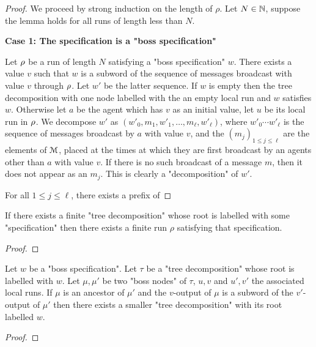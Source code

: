 \begin{proof}
	We proceed by strong induction on the length of $\rho$.
	Let $N \in \mathbb{N}$, suppose the lemma holds for all runs of length less than $N$.
	
	\textbf{Case 1: The specification is a "boss specification"}
	
	Let $\rho$ be a run of length $N$ satisfying a "boss specification" $w$.
	There exists a value $v$ such that $w$ is a subword of the sequence of messages broadcast with value $v$ through $\rho$. Let $w'$ be the latter sequence.
	If $w$ is empty then the tree decomposition with one node labelled with the an empty local run and $w$ satisfies $w$.	
	Otherwise let $a$ be the agent which has $v$ as an initial value, let $u$ be its local run in $\rho$. 
	We decompose $w'$ as $(w'_0, m_1, w'_1, \ldots, m_\ell, w'_\ell)$, where $w'_0\cdots w'_\ell$ is the sequence of messages broadcast by $a$ with value $v$, and the $(m_j)_{1\leq j\leq \ell}$ are the elements of $\mathcal{M}$, placed at the times at which they are first broadcast by an agents other than $a$ with value $v$. If there is no such broadcast of a message $m$, then it does not appear as an $m_j$. This is clearly a "decomposition" of $w'$.
	
	For all $1 \leq j \leq \ell$, there exists a prefix of 
\end{proof}

\begin{lemma}
	If there exists a finite "tree decomposition" whose root is labelled with some "specification" then there exists  a finite run $\rho$ satisfying that specification.
\end{lemma}

\begin{proof}
\end{proof}

\begin{lemma}
	Let $w$ be a "boss specification".
	Let $\tau$ be a "tree decomposition" whose root is labelled with $w$.
	Let $\mu, \mu'$ be two "boss nodes" of $\tau$, $u, v$ and $u', v'$ the associated local runs.
	If $\mu$ is an ancestor of $\mu'$ and the $v$-output of $\mu$ is a subword of the $v'$-output of $\mu'$ then there exists a smaller "tree decomposition" with its root labelled $w$.  
\end{lemma}

\begin{proof}
\end{proof}

